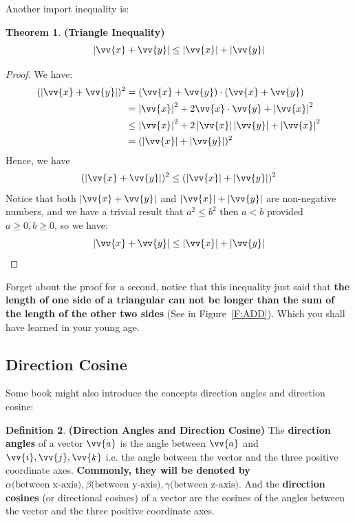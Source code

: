\documentclass[12pt, a4paper, reqno]{amsart}
\theoremstyle{definition}
\newtheorem{theorem}{Theorem}[subsection] %
\newtheorem{definition}[theorem]{Definition} %
\numberwithin{equation}{section} %
\begin{document}
Another import inequality is:
\begin{theorem}\label{TRI} \textbf{(Triangle Inequality)}
	\begin{equation}\label{E:TRI}
		\left|\vv{x}+\vv{y}\right| \le \left|\vv{x}\right| + \left|\vv{y}\right|
	\end{equation}
\end{theorem}

\begin{proof}
	We have:
	\begin{align*}
		(\left|\vv{x}+\vv{y}\right|)^2 &= (\vv{x}+\vv{y})\cdot (\vv{x}+\vv{y})\\
		 &= \left|\vv{x}\right|^2 + 2\vv{x}\cdot \vv{y} + \left|\vv{x}\right|^2\\
		 &\le \left|\vv{x}\right|^2 + 2\left|\vv{x}\right|\left|\vv{y}\right| + \left|\vv{x}\right|^2\\
		 &= (\left|\vv{x}\right| + \left|\vv{y}\right|)^2
	\end{align*}
	Hence, we have
	\begin{equation*}
		(\left|\vv{x}+\vv{y}\right|)^2 \le (\left|\vv{x}\right| + \left|\vv{y}\right|)^2
	\end{equation*}
	Notice that both $\left|\vv{x}+\vv{y}\right|$ and $\left|\vv{x}\right| + \left|\vv{y}\right|$ are non-negative numbers, and we have a trivial result that $a^2 \le b^2$ then $a < b$ provided $a \ge 0, b\ge 0$, so we have:
	\begin{equation*}
		\left|\vv{x}+\vv{y}\right| \le \left|\vv{x}\right| + \left|\vv{y}\right|
	\end{equation*}
\end{proof}
Forget about the proof for a second, notice that this inequality just said that \textbf{the length of one side of a triangular can not be longer than the sum of the length of the other two sides} (See in Figure~\ref{F:ADD}). Which you shall have learned in your young age.

\subsection{Direction Cosine}\label{SS:DC}\hfill

Some book might also introduce the concepts direction angles and direction cosine:
\begin{definition}\label{D:DC} \textbf{(Direction Angles and Direction Cosine)}
	The \textbf{direction angles} of a vector $\vv{a}$ is the angle between $\vv{a}$ and $\vv{i}, \vv{j}, \vv{k}$ i.e. the angle between the vector and the three positive coordinate axes. \textbf{Commonly, they will be denoted by $\alpha \text{(between x-axis)}, \beta\text{(between y-axis)}, \gamma\text{(between z-axis)}$}. And the \textbf{direction cosines} (or directional cosines) of a vector are the cosines of the angles between the vector and the three positive coordinate axes.
\end{definition}
\end{document}
